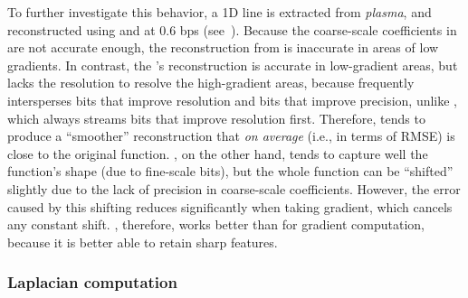 To further investigate this behavior, a 1D line is extracted from \emph{plasma}, and reconstructed
using \sbit and \swav at 0.6 bps (see~). Because the
coarse-scale coefficients in \sbit are not accurate enough, the reconstruction from \sbit is
inaccurate in areas of low gradients. In contrast, the \swav's reconstruction is accurate in
low-gradient areas, but lacks the resolution to resolve the high-gradient areas, because \swav
frequently intersperses bits that improve resolution and bits that improve precision, unlike \sbit,
which always streams bits that improve resolution first. Therefore, \swav tends to produce a
``smoother'' reconstruction that \emph{on average} (i.e., in terms of RMSE) is close to the original
function. \sbit, on the other hand, tends to capture well the function's shape (due to fine-scale
bits), but the whole function can be ``shifted'' slightly due to the lack of precision in
coarse-scale coefficients. However, the error caused by this shifting reduces significantly when
taking gradient, which cancels any constant shift. \sbit, therefore, works better than \swav for
gradient computation, because it is better able to retain sharp features.


\subsubsection{Laplacian computation}\label{sec:laplacian}

